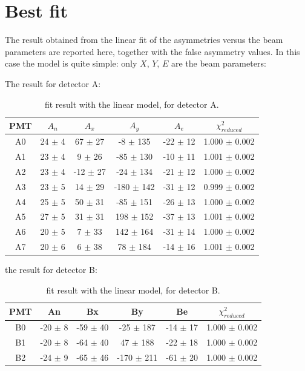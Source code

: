 \newpage
\section{Best fit}
The result obtained from the linear fit of the asymmetries versus the beam parameters are reported here, together with the false asymmetry values. In this case the model is quite simple: only $X$, $Y$, $E$ are the beam parameters:

The result for detector A:
\begin{table}[h] 
\centering
\begin{tabular}{c|c|c|c|c|c}
\hline
 PMT   & $A_{n}$    & $A_{x}$          & $A_{y}$            & $A_{e}$         & $\chi^{2}_{reduced}$ \\
\hline
 A0    & 24 $\pm$ 4 & 67 $\pm$ 27  & -8 $\pm$ 135   & -22 $\pm$ 12 & 1.000 $\pm$ 0.002   \\
 A1    & 23 $\pm$ 4 & 9 $\pm$ 26   & -85 $\pm$ 130  & -10 $\pm$ 11 & 1.001 $\pm$ 0.002 \\
 A2    & 23 $\pm$ 4 & -12 $\pm$ 27 & -24 $\pm$ 134  & -21 $\pm$ 12 & 1.000 $\pm$ 0.002   \\
 A3    & 23 $\pm$ 5 & 14 $\pm$ 29  & -180 $\pm$ 142 & -31 $\pm$ 12 & 0.999 $\pm$ 0.002 \\
 A4    & 25 $\pm$ 5 & 50 $\pm$ 31  & -85 $\pm$ 151  & -26 $\pm$ 13 & 1.000 $\pm$ 0.002   \\
 A5    & 27 $\pm$ 5 & 31 $\pm$ 31  & 198 $\pm$ 152  & -37 $\pm$ 13 & 1.001 $\pm$ 0.002 \\
 A6    & 20 $\pm$ 5 & 7 $\pm$ 33   & 142 $\pm$ 164  & -31 $\pm$ 14 & 1.000 $\pm$ 0.002   \\
 A7    & 20 $\pm$ 6 & 6 $\pm$ 38   & 78 $\pm$ 184   & -14 $\pm$ 16 & 1.001 $\pm$ 0.002 \\
\hline
\end{tabular}
\caption{fit result with the linear model, for detector A.}
\label{tb:resultA}
\end{table}

the result for detector B:
\begin{table}[h]
\centering
\begin{tabular}{c|c|c|c|c|c}
\hline
 PMT   & An         & Bx         & By           & Be        & $\chi^{2}_{reduced}$\\
\hline
 B0    & -20 $\pm$ 8 & -59 $\pm$ 40 & -25 $\pm$ 187  & -14 $\pm$ 17  & 1.000 $\pm$ 0.002 \\
 B1    & -20 $\pm$ 8  & -64 $\pm$ 40 & 47 $\pm$ 188    & -22 $\pm$ 18 & 1.000 $\pm$ 0.002 \\
 B2    & -24 $\pm$ 9 & -65 $\pm$ 46 & -170 $\pm$ 211 & -61 $\pm$ 20 & 1.000 $\pm$ 0.002 \\
\hline
\end{tabular}
\caption{fit result with the linear model, for detector B.}
\end{table}

